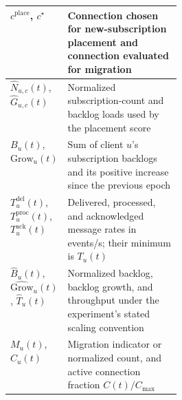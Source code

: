 \begin{longtable}{|>{\raggedright\arraybackslash}p{0.29\linewidth}|>{\raggedright\arraybackslash}p{}|}
		$c^{\mathrm{place}}$, $c^\star$
		& Connection chosen for new-subscription placement and connection evaluated for migration \\ \hline

		$\widehat{N}_{u,c}(t)$, $\widehat{G}_{u,c}(t)$
		& Normalized subscription-count and backlog loads used by the placement score \\ \hline

		$B_u(t)$, $\mathrm{Grow}_u(t)$
		& Sum of client $u$'s subscription backlogs and its positive increase since the previous epoch \\ \hline

		$T^{\mathrm{del}}_u(t)$, $T^{\mathrm{proc}}_u(t)$, $T^{\mathrm{ack}}_u(t)$
		& Delivered, processed, and acknowledged message rates in events/s; their minimum is $T_u(t)$ \\ \hline

		$\widehat{B}_u(t)$, $\widehat{\mathrm{Grow}}_u(t)$, $\widehat{T}_u(t)$
		& Normalized backlog, backlog growth, and throughput under the experiment's stated scaling convention \\ \hline

		$M_u(t)$, $\widehat{C}_u(t)$
		& Migration indicator or normalized count, and active connection fraction $C(t)/C_{\max}$ \\ \hline
\end{longtable}
\endgroup

